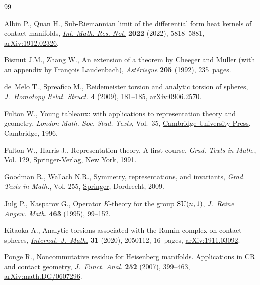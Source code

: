 \begin{thebibliography}{99}
\footnotesize\itemsep=0pt

Albin P., Quan H., Sub-{R}iemannian limit of the differential form heat kernels
 of contact manifolds, \href{https://doi.org/10.1093/imrn/rnaa270}{\textit{Int. Math. Res. Not.}} \textbf{2022} (2022),
 5818--5881, \href{http://arxiv.org/abs/1912.02326}{arXiv:1912.02326}.

Bismut J.M., Zhang W., An extension of a theorem by {C}heeger and {M}\"{u}ller
 (with an appendix by Fran\c{c}ois Laudenbach), \textit{Ast\'{e}risque}
 \textbf{205} (1992), 235~pages.

de~Melo T., Spreafico M., Reidemeister torsion and analytic torsion of spheres,
 \textit{J.~Homotopy Relat. Struct.} \textbf{4} (2009), 181--185,
 \href{http://arxiv.org/abs/0906.2570}{arXiv:0906.2570}.

Fulton W., Young tableaux: with applications to representation theory and
 geometry, \textit{London Math. Soc. Stud. Texts}, Vol.~35, \href{https://doi.org/10.1017/CBO9780511626241}{Cambridge
 University Press}, Cambridge, 1996.

Fulton W., Harris J., Representation theory. A first course, \textit{Grad.
 Texts in Math.}, Vol. 129, \href{https://doi.org/10.1007/978-1-4612-0979-9}{Springer-Verlag}, New York, 1991.

Goodman R., Wallach N.R., Symmetry, representations, and invariants,
 \textit{Grad. Texts in Math.}, Vol. 255, \href{https://doi.org/10.1007/978-0-387-79852-3}{Springer}, Dordrecht, 2009.

Julg P., Kasparov G., Operator {$K$}-theory for the group {${\rm SU}(n,1)$},
 \href{https://doi.org/10.1515/crll.1995.463.99}{\textit{J.~Reine Angew. Math.}} \textbf{463} (1995), 99--152.

Kitaoka A., Analytic torsions associated with the {R}umin complex on contact
 spheres, \href{https://doi.org/10.1142/S0129167X20501128}{\textit{Internat. J.~Math.}} \textbf{31} (2020), 2050112, 16~pages,
 \href{http://arxiv.org/abs/1911.03092}{arXiv:1911.03092}.

Ponge R., Noncommutative residue for {H}eisenberg manifolds. {A}pplications in
 {CR} and contact geometry, \href{https://doi.org/10.1016/j.jfa.2007.07.001}{\textit{J.~Funct. Anal.}} \textbf{252} (2007),
 399--463, \href{http://arxiv.org/abs/math.DG/0607296}{arXiv:math.DG/0607296}.


\end{thebibliography}
